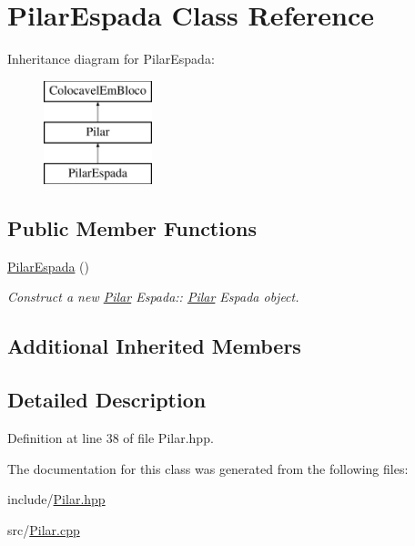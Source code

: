 \hypertarget{class_pilar_espada}{}\section{Pilar\+Espada Class Reference}
\label{class_pilar_espada}
Inheritance diagram for Pilar\+Espada\+:\begin{figure}[H]
\begin{center}
\leavevmode
\includegraphics[height=3.000000cm]{class_pilar_espada}
\end{center}
\end{figure}
\subsection*{Public Member Functions}
\begin{DoxyCompactItemize}
\item 
\mbox{\label{class_pilar_espada_abacf1e7d96b647406acb6e9630cd0425}} 
\mbox{\hyperlink{class_pilar_espada_abacf1e7d96b647406acb6e9630cd0425}{Pilar\+Espada}} ()
\begin{DoxyCompactList}\small\item\em Construct a new \mbox{\hyperlink{class_pilar}{Pilar}} Espada\+:\+: \mbox{\hyperlink{class_pilar}{Pilar}} Espada object. \end{DoxyCompactList}\end{DoxyCompactItemize}
\subsection*{Additional Inherited Members}


\subsection{Detailed Description}


Definition at line 38 of file Pilar.\+hpp.



The documentation for this class was generated from the following files\+:\begin{DoxyCompactItemize}
\item 
include/\mbox{\hyperlink{_pilar_8hpp}{Pilar.\+hpp}}\item 
src/\mbox{\hyperlink{_pilar_8cpp}{Pilar.\+cpp}}\end{DoxyCompactItemize}
